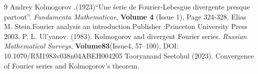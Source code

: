 \documentclass{article}
\begin{document}
























\begin{thebibliography}{9}
Andrey Kolmogorov .(1923)“Une śerie de Fourier-Lebesgue divergente presque partout”. \textit{Fundamenta Mathematicae}, \textbf{Volume 4 }(Issue 1), Page 324-328.
Elias M. Stein.Fourier analysis an introduction.Publisher :Princeton University Press 2003.
P. L. Ul’yanov. (1983). Kolmogorov and divergent Fourier series. \textit{Russian Mathematical Surveys}, \textbf{Volume83}(Issue4, 57–100), DOI: 10.1070/RM1983v038n04ABEH004205
Tooryanand Seetohul (2023). Convergence of Fourier series and Kolmogorov’s theorem. 

\end{thebibliography}
\end{document}
